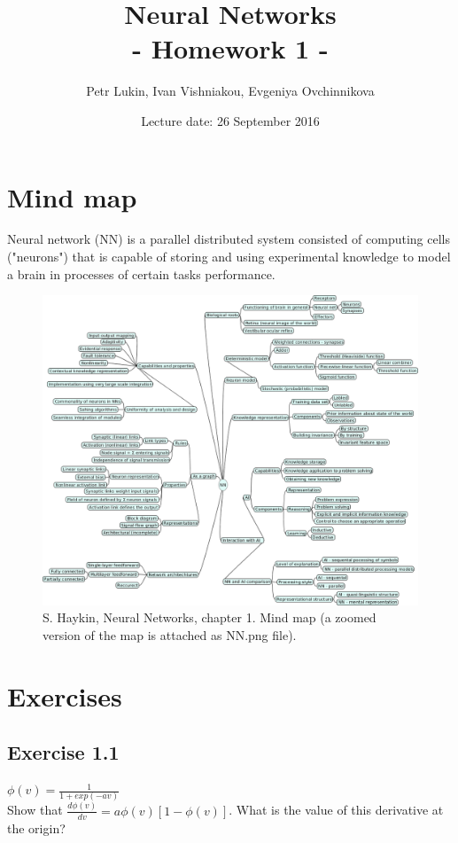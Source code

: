 \documentclass[a4paper, 12pt]{article}
\title{Neural Networks  \\
				- Homework 1 -}
\author{Petr Lukin, Ivan Vishniakou, Evgeniya Ovchinnikova}
\date{Lecture date: 26 September 2016}
\begin{document}
\maketitle

\section{Mind map}
Neural network (NN) is a parallel distributed system consisted of computing cells ("neurons") that is capable of storing and using experimental knowledge to model a brain in processes of certain tasks performance.

\begin{figure}[h]
  \centering
  \caption{S. Haykin, Neural Networks, chapter 1. Mind map (a zoomed version of the map is attached as NN.png file).\label{fig:mindMap}}
  \includegraphics[width=1.0\textwidth]{NN}
\end{figure}

\section{Exercises}

\subsection{Exercise 1.1}

$\phi(v) = \frac{1}{1 + exp(-av)}$\\

Show that $\frac{d\phi(v)}{dv} = a\phi(v)[1 - \phi(v)]$. What is the value of this derivative at the origin?\\
\end{document}
